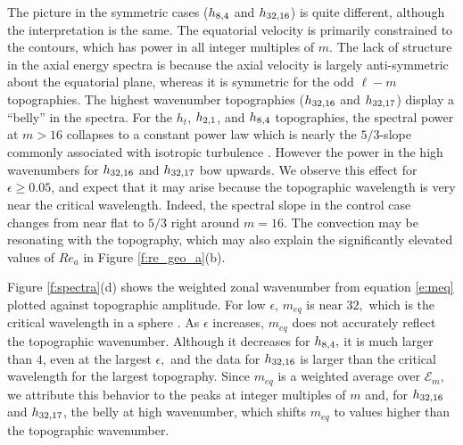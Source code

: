 The picture in the symmetric cases ($h_{8,4}$ and $h_{32,16}$) is quite different, although the interpretation is the same. The equatorial velocity is primarily constrained to the contours, which has power in all integer multiples of $m.$ 
The lack of structure in the axial energy spectra is because the axial velocity is largely anti-symmetric about the equatorial plane, whereas it is symmetric for the odd $\ell-m$ topographies.
The highest wavenumber topographies ($h_{32,16}$ and $h_{32,17}$) display a ``belly'' in the spectra. 
For the $h_{t}$, $h_{2,1}$, and $h_{8,4}$ topographies, the spectral power at $m>16$ collapses to a constant power law which is nearly the $5/3$-slope commonly associated with isotropic turbulence \citep{sP00}. 
However the power in the high wavenumbers for $h_{32,16}$ and $h_{32,17}$ bow upwards. 
We observe this effect for $\epsilon \geq0.05$, and expect that it may arise because the topographic wavelength is very near the critical wavelength. 
Indeed, the spectral slope in the control case changes from near flat to $5/3$ right around $m=16.$ The convection may be resonating with the topography, which may also explain the significantly elevated values of $Re_{a}$ in Figure \ref{f:re_geo_a}(b).

Figure \ref{f:spectra}(d) shows the weighted zonal wavenumber from equation \eqref{e:meq} plotted against topographic amplitude. For low $\epsilon$, $m_{eq}$ is near $32,$ which is the critical wavelength in a sphere \citep{aB22}. 
As $\epsilon$ increases, $m_{eq}$ does not accurately reflect the topographic wavenumber. 
Although it decreases for $h_{8,4},$ it is much larger than $4$, even at the largest $\epsilon,$ and the data for $h_{32,16}$ is larger than the critical wavelength for the largest topography. 
Since $m_{eq}$ is a weighted average over $\mathcal{E}_{m},$ we attribute this behavior to the peaks at integer multiples of $m$ and, for $h_{32,16}$ and  $h_{32,17}$, the belly at high wavenumber, which shifts $m_{eq}$ to values higher than the topographic wavenumber.

